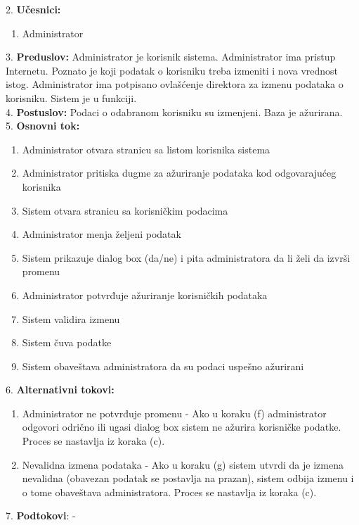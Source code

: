 \documentclass{article}
\begin{document}
2. \textbf{Učesnici:}
\begin{enumerate} [label=(\alph*)]
\item Administrator
\end{enumerate} 

3. \textbf{Preduslov:} Administrator je korisnik sistema. Administrator ima pristup Internetu. Poznato je koji podatak o korisniku treba izmeniti i nova vrednost istog. Administrator ima potpisano ovlašćenje direktora za izmenu podataka o korisniku. Sistem je u funkciji. \\

4. \textbf{Postuslov:} Podaci o odabranom korisniku su izmenjeni. Baza je ažurirana. \\

5. \textbf{Osnovni tok:} 
\begin{enumerate} [label=(\alph*)]
\item Administrator otvara stranicu sa listom korisnika sistema
\item Administrator pritiska dugme za ažuriranje podataka kod odgovarajućeg korisnika
\item Sistem otvara stranicu sa korisničkim podacima
\item Administrator menja željeni podatak
\item Sistem prikazuje dialog box (da/ne) i pita administratora da li želi da izvrši promenu
\item Administrator potvrđuje ažuriranje korisničkih podataka
\item Sistem validira izmenu
\item Sistem čuva podatke
\item Sistem obaveštava administratora da su podaci uspešno ažurirani
\end{enumerate}

6. \textbf{Alternativni tokovi:}
\begin{enumerate} [label=(\roman*)]
    \item Administrator ne potvrđuje promenu - Ako u koraku (f) administrator odgovori odrično ili ugasi dialog box sistem ne ažurira korisničke podatke. Proces se nastavlja iz koraka (c).
    \item Nevalidna izmena podataka - Ako u koraku (g) sistem utvrdi da je izmena nevalidna (obavezan podatak se postavlja na prazan), sistem odbija izmenu i o tome obaveštava administratora. Proces se nastavlja iz koraka (c).
\end{enumerate}

7. \textbf{Podtokovi}: - \\
\end{document}
